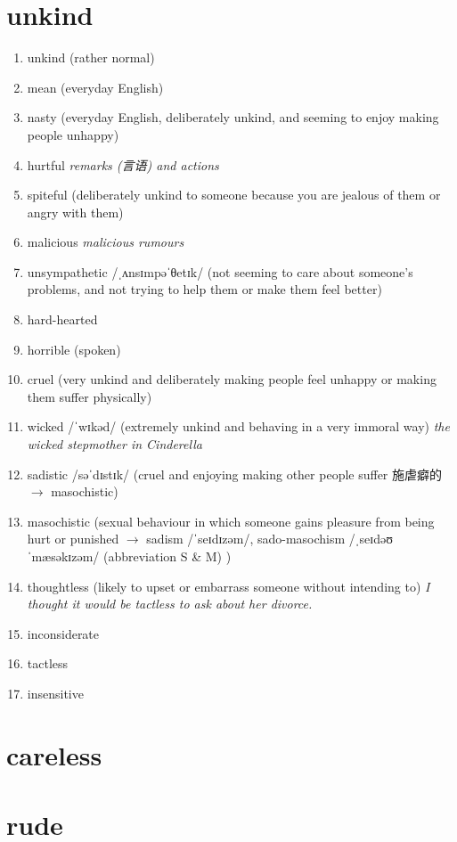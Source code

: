\section{unkind}
\begin{enumerate}
    \item unkind (rather normal)
    \item mean (everyday English)
    \item nasty (everyday English, deliberately unkind, and seeming to enjoy making people unhappy)
    \item hurtful \textit{remarks (言语) and actions}
    \item spiteful (deliberately unkind to someone because you are jealous of them or angry with them)
    \item malicious \textit{malicious rumours}
    \item unsympathetic /ˌʌnsɪmpəˈθetɪk/ (not seeming to care about someone's problems, and not trying to help them or make them feel better)
    \item hard-hearted
    \item horrible (spoken)
    \item cruel (very unkind and deliberately making people feel unhappy or making them suffer physically)
    \item wicked /ˈwɪkəd/ (extremely unkind and behaving in a very immoral way) \textit{the wicked stepmother in Cinderella}
    \item sadistic /səˈdɪstɪk/ (cruel and enjoying making other people suffer 施虐癖的 $\rightarrow$ masochistic)
    \item masochistic (sexual behaviour in which someone gains pleasure from being hurt or punished $\rightarrow$ sadism /ˈseɪdɪzəm/, sado-masochism /ˌseɪdəʊˈmæsəkɪzəm/ (abbreviation S \& M) )
    \item thoughtless (likely to upset or embarrass someone without intending to) \textit{I thought it would be tactless to ask about her divorce.}
    \item inconsiderate
    \item tactless
    \item insensitive
\end{enumerate}

\section{careless}

\section{rude}